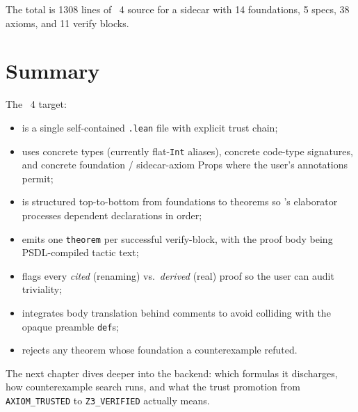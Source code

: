The total is 1308 lines of \Lean{}~4 source for a sidecar with 14
foundations, 5 specs, 38 axioms, and 11 verify blocks.

\section{Summary}

The \Lean{}~4 target:
\begin{itemize}[leftmargin=1.7em]
  \item is a single self-contained \texttt{.lean} file with explicit
    trust chain;
  \item uses concrete types (currently flat-\texttt{Int} aliases),
    concrete code-type signatures, and concrete foundation /
    sidecar-axiom Props where the user's annotations permit;
  \item is structured top-to-bottom from foundations to theorems
    so \Lean's elaborator processes dependent declarations in
    order;
  \item emits one \texttt{theorem} per successful verify-block,
    with the proof body being PSDL-compiled tactic text;
  \item flags every \emph{cited} (renaming) vs.\ \emph{derived}
    (real) proof so the user can audit triviality;
  \item integrates body translation behind comments to avoid
    colliding with the opaque preamble \texttt{def}s;
  \item rejects any theorem whose foundation a counterexample
    refuted.
\end{itemize}

The next chapter dives deeper into the \Zthree{} backend: which
formulas it discharges, how counterexample search runs, and what
the trust promotion from \texttt{AXIOM\_TRUSTED} to
\texttt{Z3\_VERIFIED} actually means.
